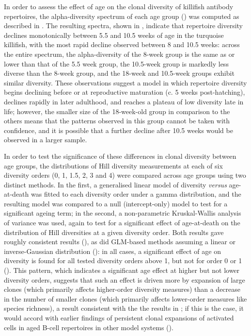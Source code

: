 In order to assess the effect of age on the clonal diversity of killifish antibody repertoires, the alpha-diversity spectrum of each age group () was computed as described in . The resulting spectra, shown in , indicate that repertoire diversity declines monotonically between 5.5 and 10.5 weeks of age in the turquoise killifish, with the most rapid decline observed between 8 and 10.5 weeks: across the entire spectrum, the alpha-diversity of the 8-week group is the same as or lower than that of the 5.5 week group, the 10.5-week group is markedly less diverse than the 8-week group, and the 18-week and 10.5-week groups exhibit similar diversity. These observations suggest a model in which repertoire diversity begins declining before or at reproductive maturation (c. 5 weeks post-hatching), declines rapidly in later adulthood, and reaches a plateau of low diversity late in life; however, the smaller size of the 18-week-old group in comparison to the others means that the patterns observed in this group cannot be taken with confidence, and it is possible that a further decline after 10.5 weeks would be observed in a larger sample.

In order to test the significance of these differences in clonal diversity between age groups, the distributions of Hill diversity measurements at each of six diversity orders (0, 1, 1.5, 2, 3 and 4) were compared across age groups using two distinct methods. In the first, a generalised linear model of diversity \textit{versus} age-at-death was fitted to each diversity order under a gamma distribution, and the resulting model was compared to a null (intercept-only) model to test for a significant ageing term; in the second, a non-parametric Kruskal-Wallis analysis of variance was used, again to test for a significant effect of age-at-death on the distribution of Hill diversities at a given diversity order. Both results gave roughly consistent results (), as did GLM-based methods assuming a linear or inverse-Gaussian distribution (): in all cases, a significant effect of age on diversity is found for all tested diversity orders above 1, but not for order 0 or 1 (). This pattern, which indicates a significant age effect at higher but not lower diversity orders, suggests that such an effect is driven more by expansion of large clones (which primarily affects higher-order diversity measures) than a decrease in the number of smaller clones (which primarily affects lower-order measures like species richness), a result consistent with the the results in ; if this is the case, it would accord with earlier findings of persistent clonal expansions of activated cells in aged B-cell repertoires in other model systems ().


